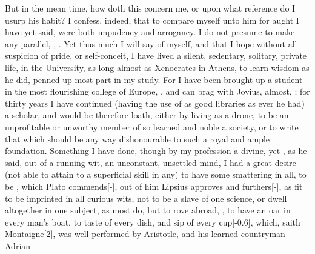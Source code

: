 {But in the mean time, how doth this concern me, or upon what reference
do I usurp his habit? I confess, indeed, that to compare myself unto
him for aught I have yet said, were both impudency and arrogancy. I do
not presume to make any parallel, , . Yet thus much I
will say of myself, and that I hope without all suspicion of pride, or
self-conceit, I have lived a silent, sedentary, solitary, private life,
 in the University, as long almost as Xenocrates in
Athens,  to learn wisdom as he did, penned up most part
in my study. For I have been brought up a student in the most
flourishing college of Europe, , and can brag
with Jovius, almost, ; for thirty years I
have continued (having the use of as good libraries as ever he had)
a scholar, and would be therefore loath, either by living as a drone,
to be an unprofitable or unworthy member of so learned and noble a
society, or to write that which should be any way dishonourable to such
a royal and ample foundation. Something I have done, though by my
profession a divine, yet , as he said, out of
a running wit, an unconstant, unsettled mind, I had a great desire (not
able to attain to a superficial skill in any) to have some smattering
in all, to be , which
Plato commends[-\baselineskip], out of him Lipsius approves and furthers[-\baselineskip], as
fit to be imprinted in all curious wits, not to be a slave of one
science, or dwell altogether in one subject, as most do, but to rove
abroad, , to have an oar in every man's boat, to 
taste of every dish, and sip of every cup[-0.6\baselineskip], which, saith Montaigne[2\baselineskip],
was well performed by Aristotle, and his learned countryman Adrian
}
